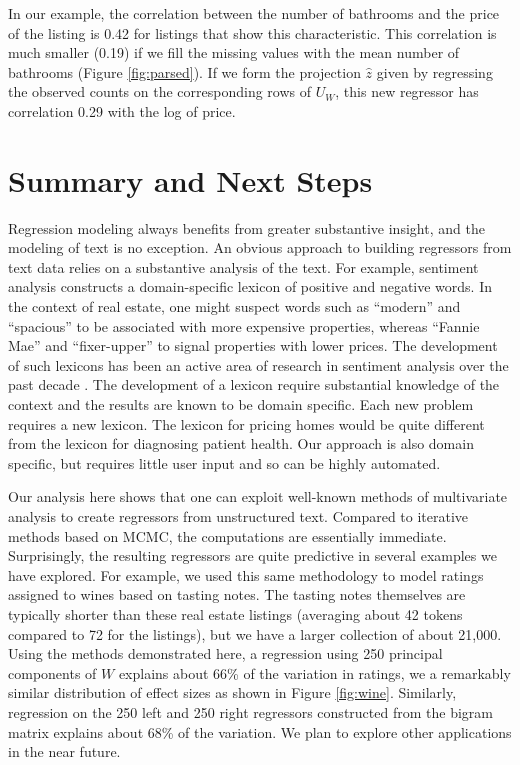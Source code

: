 \documentclass[12pt]{article}
\begin{document}
 
 In our example, the correlation between the number of bathrooms and the price of the listing is 0.42 for listings that show this characteristic.  This correlation is much smaller (0.19) if we fill the missing values with the mean number of bathrooms (Figure  \ref{fig:parsed}).  If we form the projection $\hat{z}$ given by regressing the observed counts on the corresponding rows of $U_W$, this new regressor has correlation 0.29 with the log of price.



\section{Summary and Next Steps}
\label{sec:disc}
  
  Regression modeling always benefits from greater substantive insight, and the modeling of text is no exception.  An obvious approach to building regressors from text data relies on a
 substantive analysis of the text.  For example, sentiment analysis constructs a
 domain-specific lexicon of positive and negative words.  In the context of real
 estate, one might suspect  words such as ``modern'' and ``spacious''  to be associated with more expensive properties, whereas
 ``Fannie Mae'' and ``fixer-upper'' to signal properties with lower prices.  The
 development of such lexicons has been an active area of research in sentiment
 analysis over the past decade \citep{taboada11}.  The development of a lexicon
 require substantial knowledge of the context and the results are known to be
 domain specific.  Each new problem requires a new lexicon.  The lexicon for
 pricing homes would be quite different from the lexicon for diagnosing patient
 health.  Our approach is also domain specific, but requires little user input
 and so can be highly automated.


 Our analysis here shows that one can exploit well-known methods of multivariate analysis to create regressors from unstructured text.  Compared to iterative methods based on MCMC, the computations are essentially immediate.  Surprisingly, the resulting regressors are quite predictive in several examples we have explored.  For example, we used this same methodology to model ratings assigned to wines based on tasting notes.  The tasting notes themselves are typically shorter than these real estate listings (averaging about 42 tokens compared to 72 for the listings), but we have a larger collection of about 21,000.  Using the methods demonstrated here, a regression using 250 principal components of $W$ explains about 66\% of the variation in ratings, we a remarkably similar distribution of effect sizes as shown in Figure \ref{fig:wine}.  Similarly, regression on the 250 left and 250 right regressors constructed from the bigram matrix explains about 68\% of the variation.  We plan to explore other applications in the near future.
 
\end{document}
